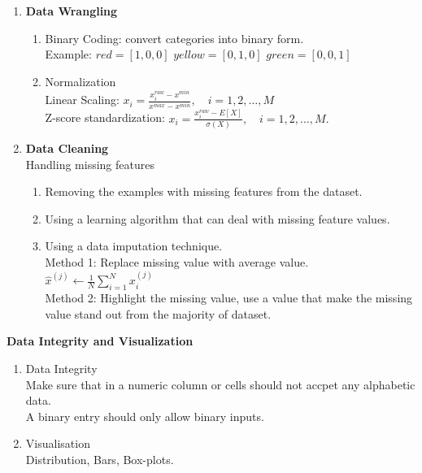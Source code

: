 \documentclass{article}
\begin{document}
\begin{enumerate}
    \item \textbf{Data Wrangling}
    \begin{enumerate}
        \item Binary Coding: convert categories into binary form.\\
        Example: $red = [1,0,0]$ $yellow = [0,1,0]$ $green = [0,0,1]$ 
        \item Normalization \\
        Linear Scaling: $\displaystyle x_i = \frac{x_i^{raw}-x^{min}}{x^{max}-x^{min}}, \quad i = 1,2,\ldots,M$ \\
        Z-score standardization: $\displaystyle x_i = \frac{x_i^{raw}-E[X]}{\sigma(X)},\quad i = 1,2,\ldots,M.$
    \end{enumerate}
    \item \textbf{Data Cleaning}\\
    Handling missing features
        \begin{enumerate}
            \item Removing the examples with missing features from the dataset.
            \item Using a learning algorithm that can deal with missing feature values.
            \item Using a data imputation technique.\\
            Method 1: Replace missing value with average value.\\
            $\displaystyle \hat{x}^{(j)} \leftarrow \frac{1}{N} \sum_{i=1}^{N} x_i^{(j)}$ \\
            Method 2: Highlight the missing value, use a value that make the missing value stand out from the majority of dataset.
        \end{enumerate}
    \end{enumerate}
\textbf{Data Integrity and Visualization}
\begin{enumerate}
    \item Data Integrity \\ 
    Make sure that in a numeric column or cells should not accpet any alphabetic data.\\
    A binary entry should only allow binary inputs.
    \item Visualisation \\
    Distribution, Bars, Box-plots.
\end{enumerate}
\end{document}
